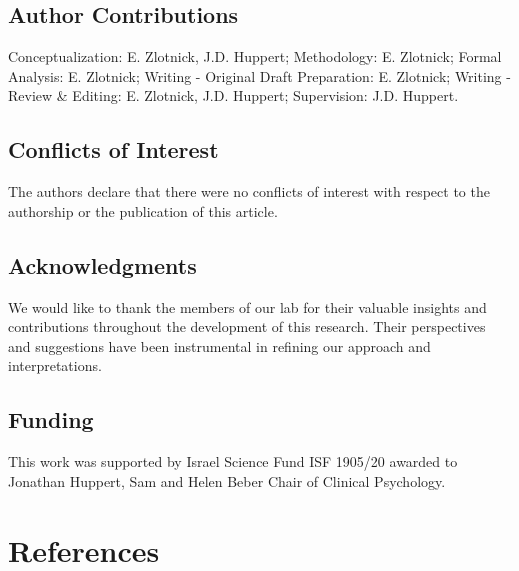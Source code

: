 \documentclass[
  man,floatsintext]{apa7}
\begin{document}
\newpage

\subsection{Author Contributions}\label{author-contributions}

Conceptualization: E. Zlotnick, J.D. Huppert;
Methodology: E. Zlotnick;
Formal Analysis: E. Zlotnick;
Writing - Original Draft Preparation: E. Zlotnick;
Writing - Review \& Editing: E. Zlotnick, J.D. Huppert;
Supervision: J.D. Huppert.

\subsection{Conflicts of Interest}\label{conflicts-of-interest}

The authors declare that there were no conflicts of interest with respect to the authorship or the publication of this article.

\subsection{Acknowledgments}\label{acknowledgments}

We would like to thank the members of our lab for their valuable insights and contributions throughout the development of this research.
Their perspectives and suggestions have been instrumental in refining our approach and interpretations.

\subsection{Funding}\label{funding}

This work was supported by Israel Science Fund ISF 1905/20 awarded to Jonathan Huppert, Sam and Helen Beber Chair of Clinical Psychology.

\newpage

\section{References}\label{references}
\end{document}
